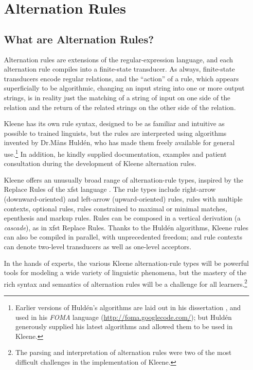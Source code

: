 \chapter{Alternation Rules}

\label{chapt:alternationrules}

\section{What are Alternation Rules?}

Alternation rules are extensions of the regular-expression language, and each alternation rule compiles into a
finite-state transducer.  As always, finite-state transducers encode regular relations, and the ``action'' of a rule,
which appears superficially to be algorithmic, changing an input string into one or more output strings, is in
reality just the matching of a string of input on one side of the relation and the return of the related strings on the
other side of the relation.

Kleene has its own rule syntax, designed to be as familiar and intuitive as possible to trained linguists, but the
rules are interpreted using algorithms invented by Dr.\@ M\r{a}ns Huldén, who has made them freely available for
general use.\footnote{Earlier versions of Huldén's algorithms are laid
out in his dissertation \citep{hulden:2009thesis}, and
used in his \emph{FOMA} language (\url{http://foma.googlecode.com/});
but Huldén generously supplied his latest algorithms and
allowed them to be used in Kleene.}  In addition, he kindly supplied
documentation, examples and patient consultation
during the development of Kleene alternation rules.  

Kleene offers an unusually broad range of alternation-rule types, inspired by the Replace Rules of the xfst
language \citep{beesley+karttunen:2003}.  The rule types include right-arrow (downward-oriented) and
left-arrow (upward-oriented) rules, rules with multiple contexts, optional rules, rules constrained
to maximal or minimal matches, epenthesis and markup rules.   Rules can be composed in a vertical
derivation (a \emph{cascade}), as in xfst Replace Rules.  Thanks to the Huldén algorithms, Kleene rules can
also be compiled in parallel, with unprecedented freedom; and rule contexts can denote two-level
transducers as well as one-level acceptors.

In the hands of experts, the various Kleene alternation-rule types will be powerful tools for
modeling a wide variety of linguistic phenomena, but the mastery of the rich syntax and semantics of
alternation rules will be a challenge for all learners.\footnote{The
	parsing and interpretation of alternation rules were two of the most
difficult challenges in the implementation of Kleene.}

